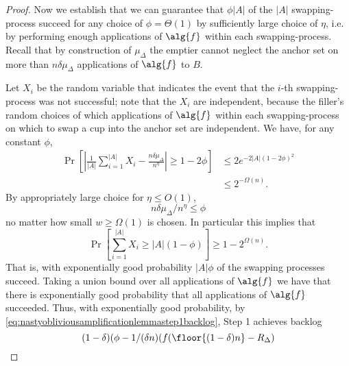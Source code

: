 \begin{proof}

  Now we establish that we can guarantee that $\phi |A|$ of the
  $|A|$ swapping-process succeed for any choice of $\phi =
  \Theta(1)$ by sufficiently large choice of $\eta$, i.e. by performing
  enough applications of $\alg{f}$ within each swapping-process.
  Recall that by construction of $\mu_\Delta$ the emptier cannot
  neglect the anchor set on more than $n\delta \mu_\Delta$
  applications of $\alg{f}$ to $B$. 

  Let $X_i$ be the random variable that indicates the event that
  the $i$-th swapping-process was not successful; note that the
  $X_i$ are independent, because the filler's random choices of
  which applications of $\alg{f}$ within each swapping-process on
  which to swap a cup into the anchor set are independent.
  We have, for any constant $\phi$,
  \begin{align*}
  \Pr\left[\left|\frac{1}{|A|}\sum_{i=1}^{|A|}X_i - \frac{n\delta\mu_\Delta}{n^{\eta}}\right| \ge 1-2\phi \right] 
  &\le 2e^{-2|A|(1-2\phi)^2} \\
  &\le 2^{-\Omega(n)}.
  \end{align*}
  By appropriately large choice for $\eta \le O(1)$, $$n\delta\mu_\Delta / n^\eta
  \le \phi$$ no matter how small $w \ge \Omega(1)$ is chosen. In particular this
  implies that $$\Pr\left[\sum_{i=1}^{|A|} X_i \ge |A|(1-\phi)\right] \ge 1-2^{\Omega(n)}.$$
  That is, with exponentially good probability $|A|\phi$ of the swapping processes succeed.
  Taking a union bound over all applications of $\alg{f}$ we have
  that there is exponentially good probability that all
  applications of $\alg{f}$ succeeded. Thus, with exponentially
  good probability, by \eqref{eq:nastyobliviousamplificationlemmastep1backlog}, Step 1 achieves
  backlog $$(1-\delta)(\phi-1/(\delta n)(f(\floor{(1-\delta)n}-R_\Delta)$$


\end{proof}
